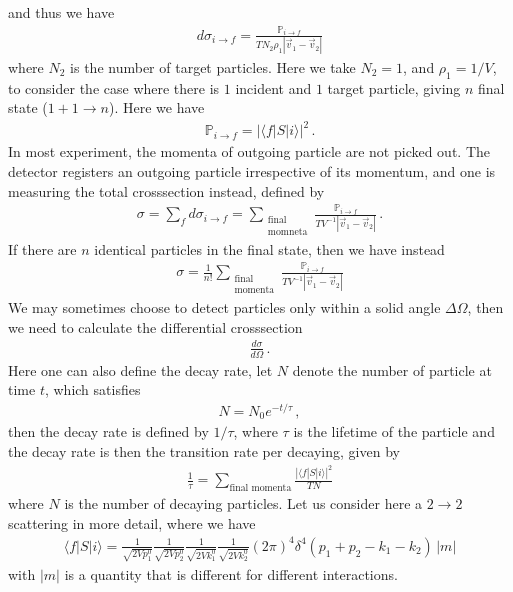 \documentclass[11pt, onesided]{book}
\theoremstyle{break}
\theoremstyle{break}
\begin{document}
and thus we have
\begin{align*}
d\sigma_{i\to f} = \frac{\mathbb{P}_{i\to f}}{T N_2 \rho_1 |\vec{v}_1 - \vec{v}_2|}
\end{align*}
where $N_2$ is the number of target particles. Here we take $N_2 = 1$, and $\rho_1 = 1/V$, to consider the case where there is $1$ incident and $1$ target particle, giving $n$ final state ($1 + 1 \to n$). Here we have
\begin{align*}
\mathbb{P}_{i\to f} = |\langle f|S | i\rangle|^2\,.
\end{align*}
In most experiment, the momenta of outgoing particle are not picked out. The detector registers an outgoing particle irrespective of its momentum, and one is measuring the total crosssection instead, defined by
\begin{align*}
\sigma = \sum_{f} d\sigma_{i\to f} = \sum_{\substack{\text{final}\\ \text{momneta}}} \frac{\mathbb{P}_{i\to f}}{TV^{-1}|\vec{v}_1 - \vec{v}_2|}\,.
\end{align*}
If there are $n$ identical particles in the final state, then we have instead
\begin{align*}
\sigma = \frac{1}{n!}\sum_{\substack{\text{final}\\\text{momenta}}}\frac{\mathbb{P}_{i\to f}}{TV^{-1}|\vec{v}_1 - \vec{v}_2|}
\end{align*}
We may sometimes choose to detect particles only within a solid angle $\Delta \Omega$, then we need to calculate the differential crosssection
\begin{align*}
\frac{d\sigma}{d\Omega}\,.
\end{align*}
Here one can also define the decay rate, let $N$ denote the number of particle at time $t$, which satisfies
\begin{align*}
N = N_0 e^{-t/\tau}\,,
\end{align*}
then the decay rate is defined by $1/\tau$, where $\tau$ is the lifetime of the particle and the decay rate is then the transition rate per decaying, given by
\begin{align*}
\frac{1}{\tau} = \sum_{\text{final momenta}} \frac{|\langle f|S|i\rangle|^2}{TN}
\end{align*}
where $N$ is the number of decaying particles. Let us consider here a $2\to 2$ scattering in more detail, where we have
\begin{align*}
 \langle f | S | i\rangle = \frac{1}{\sqrt{2Vp_1^0}}\frac{1}{\sqrt{2Vp_2^0}}\frac{1}{\sqrt{2Vk_1^0}}\frac{1}{\sqrt{2Vk_2^0}} (2\pi)^4 \delta^4(p_1 + p_2-k_1 -k_2)\,|m| 
\end{align*}
with $|m|$ is a quantity that is different for different interactions.\\
\end{document}
